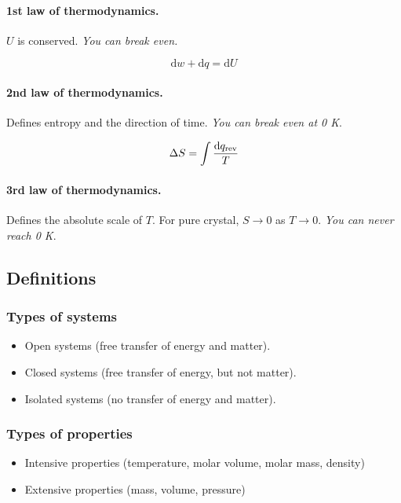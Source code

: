 \documentclass{article}
\numberwithin{theorem}{section}
\numberwithin{corollary}{section}
\numberwithin{postulate}{section}
\numberwithin{lemma}{section}
\numberwithin{definition}{section}
\begin{document}
\paragraph{1st law of thermodynamics.} $U$ is conserved. \textit{You can break
even.}

\begin{equation}
  \mathrm{d}w + \mathrm{d}q = \mathrm{d}U
\end{equation}

\paragraph{2nd law of thermodynamics.} Defines entropy and the direction of
time. \textit{You can break even at 0 K}.

\begin{equation}
  \Delta S = \int \frac{\textnormal{d} q_{\mathrm{rev}}}{T}
\end{equation}

\paragraph{3rd law of thermodynamics.} Defines the absolute scale of $T$. For
pure crystal, $S \rightarrow 0$ as $T \rightarrow 0$. \textit{You can never
reach 0 K}.

\subsection{Definitions}

\subsubsection{Types of systems}
\begin{itemize}
  \item Open systems (free transfer of energy and matter).
  \item Closed systems (free transfer of energy, but not matter).
  \item Isolated systems (no transfer of energy and matter).
\end{itemize}

\subsubsection{Types of properties}
\begin{itemize}
  \item{Intensive properties (temperature, molar volume, molar mass, density)}
  \item{Extensive properties (mass, volume, pressure)}
\end{itemize}
\end{document}
